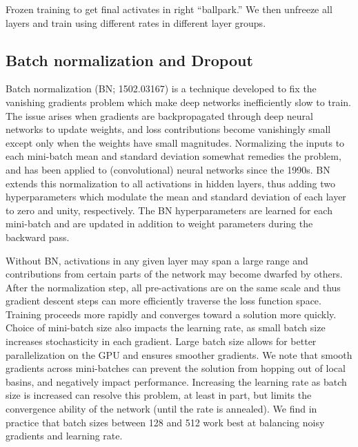 \documentclass[fleqn,usenatbib]{mnras}
\begin{document}
Frozen training to get final activates in right ``ballpark.''
We then unfreeze all layers and train using different rates in different layer groups.

\subsection{Batch normalization and Dropout}

Batch normalization (BN; 1502.03167) is a technique developed to fix the vanishing gradients problem which make deep networks inefficiently slow to train.
The issue arises when gradients are backpropagated through deep neural networks to update weights, and loss contributions become vanishingly small except only when the weights have small magnitudes.
Normalizing the inputs to each mini-batch mean and standard deviation somewhat remedies the problem, and has been applied to (convolutional) neural networks since the 1990s.
BN extends this normalization to all activations in hidden layers, thus adding two hyperparameters which modulate the mean and standard deviation of each layer to zero and unity, respectively.
The BN hyperparameters are learned for each mini-batch and are updated in addition to weight parameters during the backward pass.

Without BN, activations in any given layer may span a large range and contributions from certain parts of the network may become dwarfed by others.
After the normalization step, all pre-activations are on the same scale and thus gradient descent steps can more efficiently traverse the loss function space.
Training proceeds more rapidly and converges toward a solution more quickly.
Choice of mini-batch size also impacts the learning rate, as small batch size increases stochasticity in each gradient.
Large batch size allows for better parallelization on the GPU and ensures smoother gradients.
We note that smooth gradients across mini-batches can prevent the solution from hopping out of local basins, and negatively impact performance.
Increasing the learning rate as batch size is increased can resolve this problem, at least in part, but limits the convergence ability of the network (until the rate is annealed).
We find in practice that batch sizes between 128 and 512 work best at balancing noisy gradients and learning rate.
\end{document}
